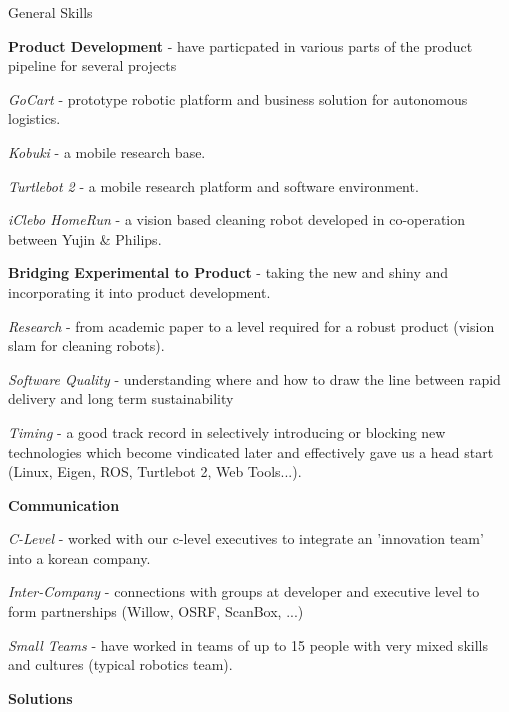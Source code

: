 \documentclass[a4paper,10pt]{article}
\begin{document}
\begin{cvsection}{General Skills}
 \raggedright
  \begin{djs_itemize}
    \item \textbf{Product Development} - have particpated in various parts of the product pipeline for several projects
    \begin{djs_itemize}
      \item \textit{GoCart} - prototype robotic platform and business solution for autonomous logistics.
      \item \textit{Kobuki} - a mobile research base.
      \item \textit{Turtlebot 2} - a mobile research platform and software environment.
      \item \textit{iClebo HomeRun} - a vision based cleaning robot developed in co-operation between Yujin \& Philips.
    \end{djs_itemize}
    \item \textbf{Bridging Experimental to Product} - taking the new and shiny and incorporating it into product development.
    \begin{djs_itemize}
      \item \textit{Research} - from academic paper to a level required for a robust product (vision slam for cleaning robots).
      \item \textit{Software Quality} - understanding where and how to draw the line between rapid delivery and long term sustainability
      \item \textit{Timing} - a good track record in selectively introducing or blocking new technologies which become vindicated later and effectively gave us a head start (Linux, Eigen, ROS, Turtlebot 2, Web Tools...).
    \end{djs_itemize}
    \item \textbf{Communication}
    \begin{djs_itemize}
      \item \textit{C-Level} - worked with our c-level executives to integrate an 'innovation team' into a korean company.
      \item \textit{Inter-Company} - connections with groups at developer and executive level to form partnerships (Willow, OSRF, ScanBox, ...)
      \item \textit{Small Teams} - have worked in teams of up to 15 people with very mixed skills and cultures (typical robotics team). 
    \end{djs_itemize}
    \item \textbf{Solutions}

\end{djs_itemize}
\end{cvsection}
\end{document}
